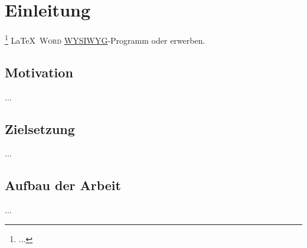 \chapter{Einleitung}


\footnote{...}
\LaTeX\
\textsc{Word}
\href{https://de.wikipedia.org/wiki/WYSIWYG}{WYSIWYG}-Programm
\parencite{voss} oder \parencite{schlosser} erwerben.

\section{Motivation}

...

\section{Zielsetzung}

...

\section{Aufbau der Arbeit}

...
